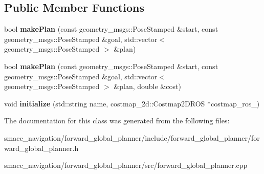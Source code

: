 \subsection*{Public Member Functions}
\begin{DoxyCompactItemize}
\item 
\hypertarget{classforward__global__planner_1_1ForwardGlobalPlanner_a0a358a0d157214dfc0a8a5d11a8f3419}{bool {\bfseries make\-Plan} (const geometry\-\_\-msgs\-::\-Pose\-Stamped \&start, const geometry\-\_\-msgs\-::\-Pose\-Stamped \&goal, std\-::vector$<$ geometry\-\_\-msgs\-::\-Pose\-Stamped $>$ \&plan)}\label{classforward__global__planner_1_1ForwardGlobalPlanner_a0a358a0d157214dfc0a8a5d11a8f3419}

\item 
\hypertarget{classforward__global__planner_1_1ForwardGlobalPlanner_ae5179c8eaf5b753141b58b80be65c240}{bool {\bfseries make\-Plan} (const geometry\-\_\-msgs\-::\-Pose\-Stamped \&start, const geometry\-\_\-msgs\-::\-Pose\-Stamped \&goal, std\-::vector$<$ geometry\-\_\-msgs\-::\-Pose\-Stamped $>$ \&plan, double \&cost)}\label{classforward__global__planner_1_1ForwardGlobalPlanner_ae5179c8eaf5b753141b58b80be65c240}

\item 
\hypertarget{classforward__global__planner_1_1ForwardGlobalPlanner_ab7bdd2ba109a83441f4863b6ffe0d748}{void {\bfseries initialize} (std\-::string name, costmap\-\_\-2d\-::\-Costmap2\-D\-R\-O\-S $\ast$costmap\-\_\-ros\-\_\-)}\label{classforward__global__planner_1_1ForwardGlobalPlanner_ab7bdd2ba109a83441f4863b6ffe0d748}

\end{DoxyCompactItemize}


The documentation for this class was generated from the following files\-:\begin{DoxyCompactItemize}
\item 
smacc\-\_\-navigation/forward\-\_\-global\-\_\-planner/include/forward\-\_\-global\-\_\-planner/forward\-\_\-global\-\_\-planner.\-h\item 
smacc\-\_\-navigation/forward\-\_\-global\-\_\-planner/src/forward\-\_\-global\-\_\-planner.\-cpp\end{DoxyCompactItemize}
